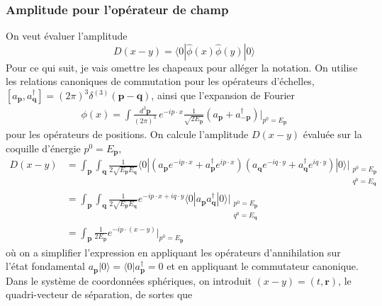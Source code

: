 \documentclass{article}
\numberwithin{equation}{section}
\begin{document}
\subsubsection{Amplitude pour l'opérateur de champ}
On veut évaluer l'amplitude 
\begin{equation}
        D(x - y) = \langle 0 | \hat{\phi}(x) \hat{\phi}(y) | 0 \rangle  
\end{equation} 
Pour ce qui suit, je vais omettre les chapeaux pour alléger la notation.
On utilise les relations canoniques de commutation pour les 
opérateurs d'échelles, $[a_{\mathbf{p}}, a^{\dagger}_{\mathbf{q}}] = (2\pi)^{3}\delta^{(3)}(\mathbf{p} - \mathbf{q})$, 
ainsi que l'expansion de Fourier
\begin{align}
        \phi(x) = \int \frac{d^{3}\mathbf{p}}{(2\pi)^{3}}\, e^{-i p \cdot x}\frac{1}{\sqrt{2E_{\mathbf{p}}}}(a_{\mathbf{p}} + a^{\dagger}_{-\mathbf{p}})\bigg|_{p^{0} = E_{\mathbf{p}}}
\end{align}
pour les opérateurs de positions. On calcule l'amplitude $D(x - y)$ évaluée sur la coquille d'énergie $p^{0} = E_{\mathbf{p}}$, 
\begin{align*}
        D(x - y) &= \int_{\mathbf{p}} \int_{\mathbf{q}} \frac{1}{2\sqrt{E_{\mathbf{p}}E_{\mathbf{q}}}}
        \langle 0 |  (a_{\mathbf{p}}e^{-i p\cdot x} + a^{\dagger}_{\mathbf{p}}e^{i p\cdot x})(a_{\mathbf{q}}e^{-i q \cdot y} + a^{\dagger}_{\mathbf{q}}e^{i q\cdot y})
        | 0 \rangle 
        \bigg|_{\substack{p^{0} = E_{\mathbf{p}} \\ q^{0} = E_{\mathbf{q}}}} \\
        &= \int_{\mathbf{p}} \int_{\mathbf{q}} \frac{1}{2\sqrt{E_{\mathbf{p}}E_{\mathbf{q}}}}
        e^{-i p \cdot x + i q\cdot y}
        \langle 0 | a_{\mathbf{p}}a^{\dagger}_{\mathbf{q}} | 0 \rangle 
        \bigg|_{\substack{p^{0} = E_{\mathbf{p}} \\ q^{0} = E_{\mathbf{q}}}} \\
        &= \int_{\mathbf{p}}  \frac{1}{2E_{\mathbf{p}}}
        e^{-i p \cdot (x - y)}\bigg|_{p^{0} = E_{\mathbf{p}}} 
\end{align*}
où on a simplifier l'expression en appliquant les opérateurs d'annihilation sur l'état fondamental $a_{\mathbf{p}} | 0 \rangle = \langle 0 |a^{\dagger}_{\mathbf{p}} = 0  $ 
et en appliquant le commutateur canonique. Dans le système de coordonnées sphériques, on introduit ${(x - y) = (t, \mathbf{r})}$, le quadri-vecteur 
de séparation, de sortes que
\end{document}
